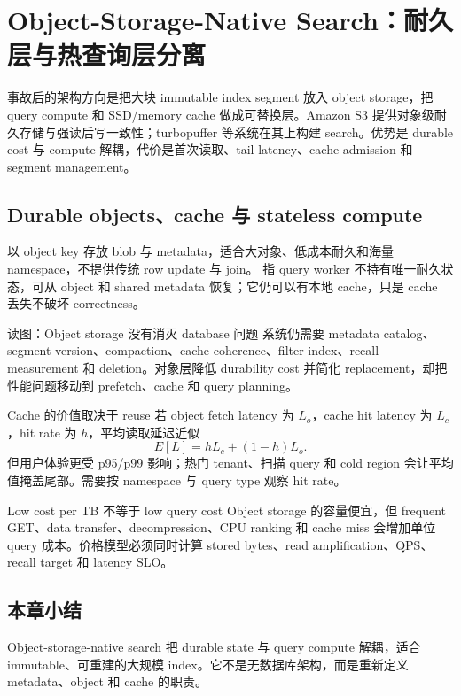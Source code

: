 \section{Object-Storage-Native Search：耐久层与热查询层分离}

事故后的架构方向是把大块 immutable index segment 放入 object storage，把 query compute 和 SSD/memory cache 做成可替换层。Amazon S3 提供对象级耐久存储与强读后写一致性；turbopuffer 等系统在其上构建 search。优势是 durable cost 与 compute 解耦，代价是首次读取、tail latency、cache admission 和 segment management。

\subsection{Durable objects、cache 与 stateless compute}

 以 object key 存放 blob 与 metadata，适合大对象、低成本耐久和海量 namespace，不提供传统 row update 与 join。 指 query worker 不持有唯一耐久状态，可从 object 和 shared metadata 恢复；它仍可以有本地 cache，只是 cache 丢失不破坏 correctness。


\begin{knowledgebox}{读图：Object storage 没有消灭 database 问题}
系统仍需要 metadata catalog、segment version、compaction、cache coherence、filter index、recall measurement 和 deletion。对象层降低 durability cost 并简化 replacement，却把性能问题移动到 prefetch、cache 和 query planning。
\end{knowledgebox}

\begin{importantbox}{Cache 的价值取决于 reuse}
若 object fetch latency 为 $L_o$，cache hit latency 为 $L_c$，hit rate 为 $h$，平均读取延迟近似
\[
E[L]=hL_c+(1-h)L_o.
\]
但用户体验更受 p95/p99 影响；热门 tenant、扫描 query 和 cold region 会让平均值掩盖尾部。需要按 namespace 与 query type 观察 hit rate。
\end{importantbox}

\begin{warningbox}{Low cost per TB 不等于 low query cost}
Object storage 的容量便宜，但 frequent GET、data transfer、decompression、CPU ranking 和 cache miss 会增加单位 query 成本。价格模型必须同时计算 stored bytes、read amplification、QPS、recall target 和 latency SLO。
\end{warningbox}

\subsection{本章小结}

Object-storage-native search 把 durable state 与 query compute 解耦，适合 immutable、可重建的大规模 index。它不是无数据库架构，而是重新定义 metadata、object 和 cache 的职责。

